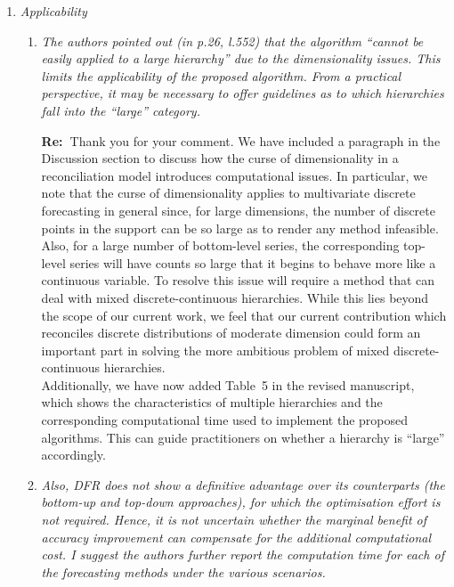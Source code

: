 \documentclass[11pt,a4paper]{article}
\newcommand{\RE}[2][Re:~]{{\color{blue}\textbf{#1}#2}}
\begin{document}
\begin{enumerate}%
\item \textit{Applicability}

  \begin{enumerate}
    \item \textit{The authors pointed out (in p.26, l.552) that the algorithm ``cannot be easily applied to a large hierarchy'' due to the dimensionality issues. This limits the applicability of the proposed algorithm. From a practical perspective, it may be necessary to offer guidelines as to which hierarchies fall into the ``large'' category. }

    \RE{Thank you for your comment. We have included a paragraph in the Discussion section to discuss how the curse of dimensionality in a reconciliation model introduces computational issues. In particular, we note that the curse of dimensionality applies to multivariate discrete forecasting in general since, for large dimensions, the number of discrete points in the support can be so large as to render any method infeasible. Also, for a large number of bottom-level series, the corresponding top-level series will have counts so large that it begins to behave more like a continuous variable. To resolve this issue will require a method that can deal with mixed discrete-continuous hierarchies. While this lies beyond the scope of our current work, we feel that our current contribution which reconciles discrete distributions of moderate dimension could form an important part in solving the more ambitious problem of mixed discrete-continuous hierarchies.\\  
    	
    Additionally, we have now added Table~5 in the revised manuscript, which shows the characteristics of multiple hierarchies and the corresponding computational time used to implement the proposed algorithms. This can guide practitioners on whether a hierarchy is ``large'' accordingly.\\}
    


    \item \textit{Also, DFR does not show a definitive advantage over its counterparts (the bottom-up and top-down approaches), for which the optimisation effort is not required. Hence, it is not uncertain whether the marginal benefit of accuracy improvement can compensate for the additional computational cost. I suggest the authors further report the computation time for each of the forecasting methods under the various scenarios.}


\end{enumerate}
\end{enumerate}
\end{document}
